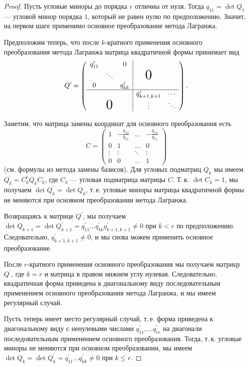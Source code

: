 \begin{proof}
    Пусть угловые миноры до порядка $r$ отличны от нуля. Тогда $q_{11} = \det Q_1$ --- угловой минор порядка $1$, который не равен нулю по предположению. Значит, на первом шаге применимо основное преобразование метода Лагранжа.

    Предположим теперь, что после $k$-кратного применения основного преобразования метода Лагранжа матрица квадратичной формы принимает вид
    \[
        Q^\prime =
        \left(
        \begin{array}{c c c | c c}
            q^\prime_{11} &  & 0 &  & \\
            & \ddots & & \bigzero & \\
            0 & & q^\prime_{kk} & &\\
            \hline
            & & & q^\prime_{k + 1, k + 1} & \cdots\\
            & \bigzero & & \vdots & \ddots
        \end{array}
        \right).
    \]

    Заметим, что матрица замены координат для основного преобразования есть
    \[
        C =
        \begin{pmatrix}
            1 & -\frac{q_{12}}{q_{11}} & \ldots & -\frac{q_{1n}}{q_{11}}\\
            0 & 1 & \ldots & 0\\
            \vdots & \vdots & \ddots & \vdots\\
            0 & 0 & \ldots & 1
        \end{pmatrix}
    \]
    (см. формулы из метода замены базисов). Для угловых подматриц $Q_k$ мы имеем $Q^\prime_k = C^t_kQ_kC_k$, где $C_k$ --- угловая подматрица матрицы $C$. Т.\,к. $\det C_k = 1$, мы получаем $\det Q^\prime_k = \det Q_k$, т.\,е. угловые миноры матрицы квадратичной формы не меняются при основном преобразовании метода Лагранжа.

    Возвращаясь к матрице $Q^\prime$, мы получаем $\det Q_{k + 1} = \det Q^\prime_{k + 1} = q^\prime_{11}\ldots q^\prime_{kk}q^\prime_{k + 1, k + 1} \ne 0$ при $k < r$ по предположению. Следовательно, $q^\prime_{k + 1, k + 1} \ne 0$, и мы снова можем применить основное преобразование.

    После $r$-кратного применения основного преобразования мы получаем матрицу $Q^\prime$, где $k = r$ и матрица в правом нижнем углу нулевая. Следовательно, квадратичная форма приведена к диагональному виду последовательным применением основного преобразования метода Лагранжа, и мы имеем регулярный случай.

    Пусть теперь имеет место регулярный случай, т.\,е. форма приведена к диагональному виду с ненулевыми числами $q^\prime_{11}, \ldots q^\prime_{rr}$ на диагонали последовательным применением основного преобразования. Тогда, т.\,к. угловые миноры не меняются при основном преобразовании, мы имеем $\det Q_k = \det Q^\prime_k = q^\prime_{11}\ldots q^\prime_{kk} \ne 0$ при $k \leqslant r$.
\end{proof}

